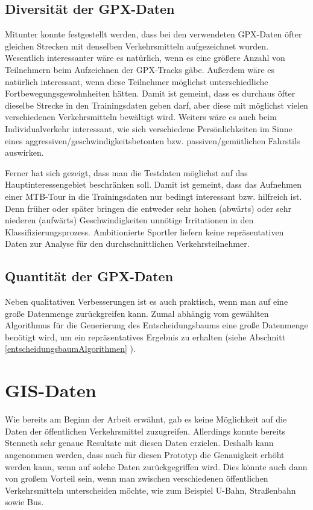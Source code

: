 \subsection{Diversität der GPX-Daten}
Mitunter konnte festgestellt werden, dass bei den verwendeten GPX-Daten öfter gleichen Strecken mit denselben Verkehrsmitteln aufgezeichnet wurden. Wesentlich interessanter wäre es natürlich, wenn es eine größere Anzahl von Teilnehmern beim Aufzeichnen der GPX-Tracks gäbe. Außerdem wäre es natürlich interessant, wenn diese Teilnehmer möglichst unterschiedliche Fortbewegungsgewohnheiten hätten. Damit ist gemeint, dass es durchaus öfter dieselbe Strecke in den Trainingsdaten geben darf, aber diese mit möglichst vielen verschiedenen Verkehrsmitteln bewältigt wird. Weiters wäre es auch beim Individualverkehr interessant, wie sich verschiedene Persönlichkeiten im Sinne eines aggressiven/geschwindigkeitsbetonten bzw. passiven/gemütlichen Fahrstils auswirken. 

Ferner hat sich gezeigt, dass man die Testdaten möglichst auf das Hauptinteressengebiet beschränken soll. Damit ist gemeint, dass das Aufnehmen einer MTB-Tour in die Trainingsdaten nur bedingt interessant bzw. hilfreich ist. Denn früher oder später bringen die entweder sehr hohen (abwärts) oder sehr niederen (aufwärts) Geschwindigkeiten unnötige Irritationen in den Klassifizierungsprozess. Ambitionierte Sportler liefern keine repräsentativen Daten zur Analyse für den durchschnittlichen Verkehrsteilnehmer. 

\subsection{Quantität der GPX-Daten}
Neben qualitativen Verbesserungen ist es auch praktisch, wenn man auf eine große Datenmenge zurückgreifen kann. Zumal abhängig vom gewählten Algorithmus für die Generierung des Entscheidungsbaums eine große Datenmenge benötigt wird, um ein repräsentatives Ergebnis zu erhalten (siehe Abschnitt \ref{entscheidungsbaumAlgorithmen} ).

\section{GIS-Daten}
Wie bereits am Beginn der Arbeit erwähnt, gab es keine Möglichkeit auf die Daten der öffentlichen Verkehrsmittel zuzugreifen. Allerdings konnte bereits Stenneth \cite{stenneth_transportation_2011} sehr genaue Resultate mit diesen Daten erzielen. Deshalb kann angenommen werden, dass auch für diesen Prototyp die Genauigkeit erhöht werden kann, wenn auf solche Daten zurückgegriffen wird. Dies könnte auch dann von großem Vorteil sein, wenn man zwischen verschiedenen öffentlichen Verkehrsmitteln unterscheiden möchte, wie zum Beispiel U-Bahn, Straßenbahn sowie Bus. 

